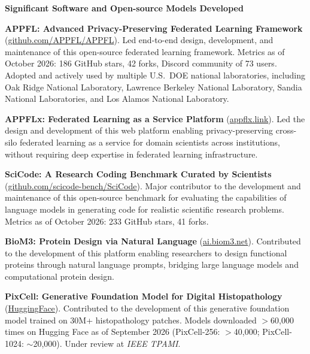 \documentclass[letterpaper,11pt]{article}
\newcommand{\PubSection}[1]{%
  \vspace{6pt}\noindent\textbf{#1}\vspace{3pt}%
}
\begin{document}
\PubSection{Significant Software and Open-source Models Developed}
\begin{enumerate}[leftmargin=1cm, label={[\arabic*]}, itemsep=3pt]
  \small
  \item \textbf{APPFL: Advanced Privacy-Preserving Federated Learning Framework} (\href{https://github.com/APPFL/APPFL}{github.com/APPFL/APPFL}). Led end-to-end design, development, and maintenance of this open-source federated learning framework. Metrics as of October 2026: 186 GitHub stars, 42 forks, Discord community of 73 users. Adopted and actively used by multiple U.S.\ DOE national laboratories, including Oak Ridge National Laboratory, Lawrence Berkeley National Laboratory, Sandia National Laboratories, and Los Alamos National Laboratory.
  
  \item \textbf{APPFLx: Federated Learning as a Service Platform} (\href{https://appflx.link/}{appflx.link}). Led the design and development of this web platform enabling privacy-preserving cross-silo federated learning as a service for domain scientists across institutions, without requiring deep expertise in federated learning infrastructure.

  \item \textbf{SciCode: A Research Coding Benchmark Curated by Scientists} (\href{https://github.com/scicode-bench/SciCode}{github.com/scicode-bench/SciCode}). Major contributor to the development and maintenance of this open-source benchmark for evaluating the capabilities of language models in generating code for realistic scientific research problems. Metrics as of October 2026: 233 GitHub stars, 41 forks.

  \item \textbf{BioM3: Protein Design via Natural Language} (\href{https://ai.biom3.net/}{ai.biom3.net}). Contributed to the development of this platform enabling researchers to design functional proteins through natural language prompts, bridging large language models and computational protein design.

  \item \textbf{PixCell: Generative Foundation Model for Digital Histopathology} (\href{https://huggingface.co/collections/StonyBrook-CVLab/pixcell}{HuggingFace}). Contributed to the development of this generative foundation model trained on 30M+ histopathology patches. Models downloaded $>$60,000 times on Hugging Face as of September 2026 (PixCell-256: $>$40,000; PixCell-1024: $\sim$20,000). Under review at \textit{IEEE TPAMI}.
\end{enumerate}
\end{document}
